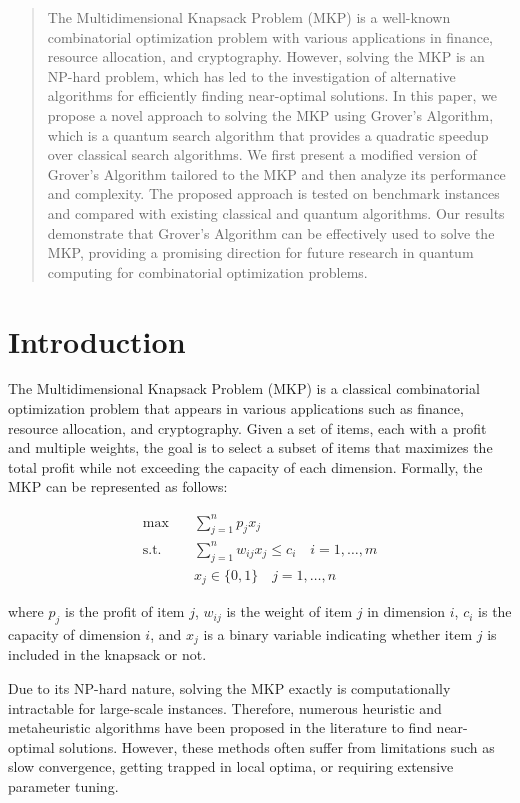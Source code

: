 \begin{abstract}
The Multidimensional Knapsack Problem (MKP) is a well-known combinatorial optimization problem with various applications in finance, resource allocation, and cryptography. However, solving the MKP is an NP-hard problem, which has led to the investigation of alternative algorithms for efficiently finding near-optimal solutions. In this paper, we propose a novel approach to solving the MKP using Grover's Algorithm, which is a quantum search algorithm that provides a quadratic speedup over classical search algorithms. We first present a modified version of Grover's Algorithm tailored to the MKP and then analyze its performance and complexity. The proposed approach is tested on benchmark instances and compared with existing classical and quantum algorithms. Our results demonstrate that Grover's Algorithm can be effectively used to solve the MKP, providing a promising direction for future research in quantum computing for combinatorial optimization problems.
\end{abstract}

\section{Introduction}
The Multidimensional Knapsack Problem (MKP) is a classical combinatorial optimization problem that appears in various applications such as finance, resource allocation, and cryptography. Given a set of items, each with a profit and multiple weights, the goal is to select a subset of items that maximizes the total profit while not exceeding the capacity of each dimension. Formally, the MKP can be represented as follows:

\begin{align}
\max \quad & \sum_{j=1}^{n} p_j x_j \\
\text{s.t.} \quad & \sum_{j=1}^{n} w_{ij} x_j \leq c_i \quad i = 1,\dots,m \\
& x_j \in \{0,1\} \quad j = 1,\dots,n
\end{align}

where $p_j$ is the profit of item $j$, $w_{ij}$ is the weight of item $j$ in dimension $i$, $c_i$ is the capacity of dimension $i$, and $x_j$ is a binary variable indicating whether item $j$ is included in the knapsack or not.

Due to its NP-hard nature, solving the MKP exactly is computationally intractable for large-scale instances. Therefore, numerous heuristic and metaheuristic algorithms have been proposed in the literature to find near-optimal solutions. However, these methods often suffer from limitations such as slow convergence, getting trapped in local optima, or requiring extensive parameter tuning.

